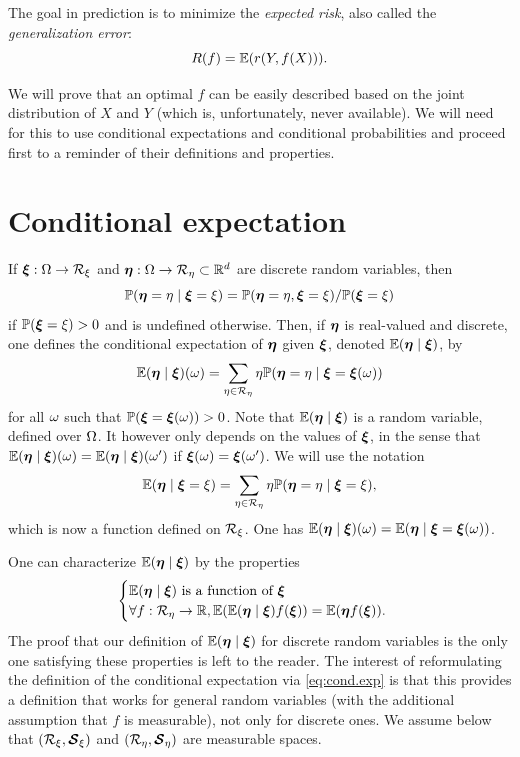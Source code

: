 The goal in prediction is to minimize the {\em expected risk}, also called the {\em generalization error}:
\[
R(f) = \bm{\mathbb E}(r(Y, f(X))).
\]

We will prove that an optimal $f$ can be easily described based on the joint distribution of $X$ and $Y$ (which is, unfortunately, never available).
We will need for this to use conditional expectations and conditional probabilities and proceed first to a reminder of their definitions and properties. 

\section{Conditional expectation}
\label{sec:cond.exp}

If $\bm \xi:\Omega \to {\mathcal R}_\xi$ and $\bm\eta:\Omega \to {\mathcal R}_\eta\subset {\mathbb{R}}^d$ are discrete random variables, then
\[
\bm{\mathbb P}(\bm\eta=\eta \mid \bm\xi=\xi) = \bm{\mathbb P}(\bm\eta=\eta, \bm\xi=\xi)/\bm{\mathbb P}(\bm\xi=\xi)
\]
if $\bm{\mathbb P}(\bm\xi =\xi) >0$ and is undefined otherwise. Then, if ${\bm{\eta}}$ is real-valued and discrete, one defines the conditional expectation of ${\bm{\eta}}$ given ${\bm{\xi}}$, denoted $\bm{\mathbb E}({\bm{\eta}}\mid {\bm{\xi}})$, by
\[
\bm{\mathbb E}({\bm{\eta}}\mid {\bm{\xi}})(\omega) = \sum_{\eta\in {\mathcal R}_\eta} \eta \bm{\mathbb P}({\bm{\eta}} =\eta \mid {\bm{\xi}}={\bm{\xi}}(\omega))
\]
for all $\omega$ such that $\bm{\mathbb P}({\bm{\xi}}={\bm{\xi}}(\omega))>0$. Note that $\bm{\mathbb E}({\bm{\eta}}\mid {\bm{\xi}})$ is a random variable, defined over $\Omega$. It however only depends on the values of ${\bm{\xi}}$, in the sense that $\bm{\mathbb E}({\bm{\eta}}\mid {\bm{\xi}})(\omega) = \bm{\mathbb E}({\bm{\eta}}\mid {\bm{\xi}})(\omega')$ if ${\bm{\xi}}(\omega) = {\bm{\xi}}(\omega')$. We will use the notation 
\[
\bm{\mathbb E}({\bm{\eta}}\mid {\bm{\xi}}=\xi) = \sum_{\eta\in {\mathcal R}_\eta} \eta \bm{\mathbb P}({\bm{\eta}}=\eta \mid {\bm{\xi}}=\xi), 
\]
which is now a function defined on ${\mathcal R}_\xi$.
One has $\bm{\mathbb E}({\bm{\eta}}\mid {\bm{\xi}})(\omega) = \bm{\mathbb E}({\bm{\eta}} \mid {\bm{\xi}}={\bm{\xi}}(\omega))$.
 
One can characterize $\bm{\mathbb E}({\bm{\eta}}\mid {\bm{\xi}})$ by the properties
\begin{equation}
\label{eq:cond.exp}
\begin{cases}
\bm{\mathbb E}({\bm{\eta}}\mid {\bm{\xi}}) \text{ is a function of ${\bm{\xi}}$}\\
\forall f: {\mathcal R}_\eta \to {\mathbb{R}}, \bm{\mathbb E}(\bm{\mathbb E}({\bm{\eta}}\mid {\bm{\xi}}) f({\bm{\xi}})) = \bm{\mathbb E}({\bm{\eta}} f({\bm{\xi}})).
\end{cases}
\end{equation}
The proof that our definition of $\bm{\mathbb E}({\bm{\eta}}\mid {\bm{\xi}})$ for discrete random variables is the only one satisfying these properties is left to the reader. The interest of reformulating the definition of the conditional expectation via \cref{eq:cond.exp} is that this provides a definition that works for general random variables (with the additional assumption that $f$ is measurable), not only for discrete ones. We assume below that $({\mathcal R}_\xi, \bm{{\mathcal S}}_\xi)$ and $({\mathcal R}_\eta, \bm{{\mathcal S}}_\eta)$ are measurable spaces.

